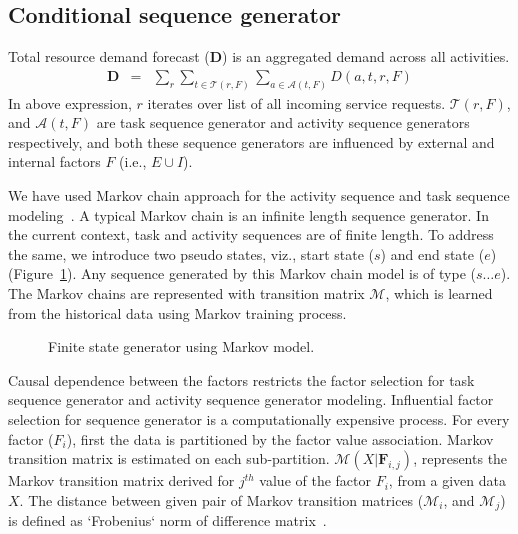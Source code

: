 \documentclass[twoside,leqno,twocolumn]{article}
\begin{document}
\subsection{Conditional sequence generator}
\label{subsec:seqgen}
Total resource demand forecast ($\mathbf{D}$) is an aggregated demand across all activities. 
\begin{eqnarray*}
\mathbf{D} & = & \sum_{r}{ \sum_{t\in \mathcal{T}(r,F)}{ \sum_{a\in\mathcal{A}(t,F)}{ D(a,t,r,F) } } } 
\end{eqnarray*} 
In above expression, $r$ iterates over list of all incoming service requests. $\mathcal{T}(r,F)$, and $\mathcal{A}(t,F)$ are task sequence generator and activity sequence generators respectively, and both these sequence generators are influenced by external and internal factors $F$ (i.e., $ E \cup I$).  
\par
We have used Markov chain approach for the activity sequence and task sequence modeling~\cite{kemeny2012}. A typical Markov chain is an infinite length sequence generator. In the current context, task and activity sequences are of finite length. To address the same, we introduce two pseudo states, viz., start state ($s$)  and end state ($e$) (Figure~\ref{markov}). Any sequence generated by this Markov chain model is of type ($s \dots e$). The Markov chains are represented with transition matrix $\mathcal{M}$, which is learned from the historical data using Markov training process. 
\begin{figure}
\centering
{}
\caption{Finite state generator using Markov model.}
\label{markov}
\end{figure}
Causal dependence between the factors restricts the factor selection for task sequence generator and activity sequence generator modeling. Influential factor selection for sequence generator is a computationally expensive process. For every factor ($F_i$), first the data is partitioned by the factor value association. Markov transition matrix is estimated on each sub-partition. $\mathcal{M}(X\vert\mathbf{F}_{i,j})$, represents the Markov transition matrix derived for $j^{th}$ value of the factor $F_{i}$, from a given data $X$. The distance between given pair of Markov transition matrices ($\mathcal{M}_i$, and $\mathcal{M}_j$) is defined as `Frobenius` norm of difference matrix~\cite{Horn:2012}.
\end{document}
